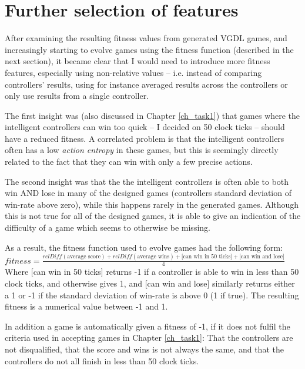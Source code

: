 \documentclass[a4paper,titlepage,final]{report}
\begin{document}


\section{Further selection of features}
\label{sec_task2furtherfeatures}

After examining the resulting fitness values from generated VGDL games, and increasingly starting to evolve games using the fitness function (described in the next section), it became clear that I would need to introduce more fitness features, especially using non-relative values -- i.e. instead of comparing controllers' results, using for instance averaged results across the controllers or only use results from a single controller.

The first insight was (also discussed in Chapter \ref{ch_task1}) that games where the intelligent controllers can win too quick -- I decided on 50 clock ticks -- should have a reduced fitness.
A correlated problem is that the intelligent controllers often has a low \textit{action entropy} in these games, but this is seemingly directly related to the fact that they can win with only a few precise actions.

The second insight was that the the intelligent controllers is often able to both win AND lose in many of the designed games (controllers standard deviation of win-rate above zero), while this happens rarely in the generated games. 
Although this is not true for all of the designed games, it is able to give an indication of the difficulty of a game which seems to otherwise be missing.

As a result, the fitness function used to evolve games had the following form: \\

$fitness = \frac{relDiff(\text{average score}) + relDiff(\text{average wins}) + \text{[can win in 50 ticks]} + \text{[can win and lose]}}{4}$ \\

Where [can win in 50 ticks] returns -1 if a  controller is able to win in less than 50 clock ticks, and otherwise gives 1, and [can win and lose] similarly returns either a 1 or -1 if the standard deviation of win-rate is above 0 (1 if true).
The resulting fitness is a numerical value between -1 and 1.

In addition a game is automatically given a fitness of -1, if it does not fulfil the criteria used in accepting games in Chapter \ref{ch_task1}: 
That the controllers are not disqualified, that the score and wins is not always the same, and that the controllers do not all finish in less than 50 clock ticks.
\end{document}
